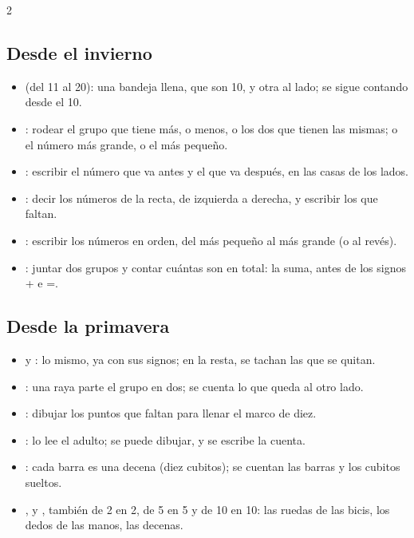 {\begin{multicols}{2}
\subsection*{Desde el invierno}
\begin{itemize}[leftmargin=5mm, itemsep=1pt, topsep=0pt]
\item \textbf{\lblDecena} (del 11 al 20): una bandeja llena, que son 10,
  y otra al lado; se sigue contando desde el 10.
\item \textbf{\lblCompara}: rodear el grupo que tiene más, o menos, o
  los dos que tienen las mismas; o el número más grande, o el más
  pequeño.
\item \textbf{\lblVecinos}: escribir el número que va antes y el que va
  después, en las casas de los lados.
\item \textbf{\lblRecta}: decir los números de la recta, de izquierda a
  derecha, y escribir los que faltan.
\item \textbf{\lblOrdena}: escribir los números en orden, del más
  pequeño al más grande (o al revés).
\item \textbf{\lblJunta}: juntar dos grupos y contar cuántas son en
  total: la suma, antes de los signos + e =.
\end{itemize}

\subsection*{Desde la primavera}
\begin{itemize}[leftmargin=5mm, itemsep=1pt, topsep=0pt]
\item \textbf{\lblSuma} y \textbf{\lblResta}: lo mismo, ya con sus
  signos; en la resta, se tachan las que se quitan.
\item \textbf{\lblParte}: una raya parte el grupo en dos; se cuenta lo
  que queda al otro lado.
\item \textbf{\lblDiez}: dibujar los puntos que faltan para llenar el
  marco de diez.
\item \textbf{\lblProblema}: lo lee el adulto; se puede dibujar, y se
  escribe la cuenta.
\item \textbf{\lblBloques}: cada barra es una decena (diez cubitos);
  se cuentan las barras y los cubitos sueltos.
\item \textbf{\lblCompleta}, \textbf{\lblRecta} y \textbf{\lblCuenta},
  también de 2 en 2, de 5 en 5 y de 10 en 10: las ruedas de las bicis,
  los dedos de las manos, las decenas.
\end{itemize}


\end{multicols}}
